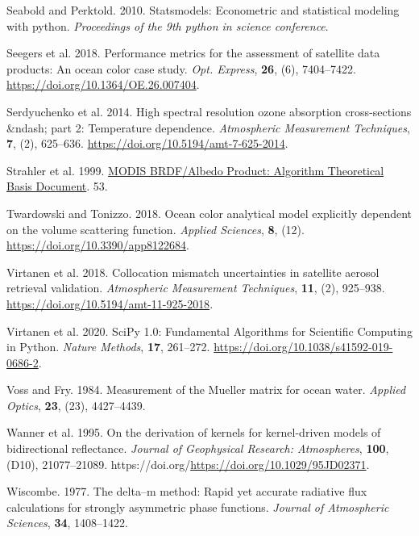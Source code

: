 \documentclass[
  11pt,
  letterpaper,
]{scrreprt}
\newlength{\cslhangindent}
\newenvironment{CSLReferences}[2] %
 {\begin{list}{}{%
  \setlength{\itemindent}{0pt}
  \setlength{\leftmargin}{0pt}
  \setlength{\parsep}{0pt}
  \ifodd #1
   \setlength{\leftmargin}{\cslhangindent}
   \setlength{\itemindent}{-1\cslhangindent}
  \fi
  \setlength{\itemsep}{#2\baselineskip}}}
 {\end{list}}
\begin{document}
\begin{CSLReferences}{1}{1}
Seabold and Perktold. 2010. Statsmodels: Econometric and statistical
modeling with python. \emph{Proceedings of the 9th python in science
conference}.

Seegers et al. 2018. Performance metrics for the assessment of satellite
data products: An ocean color case study. \emph{Opt. Express},
\textbf{26}, (6), 7404--7422.
\url{https://doi.org/10.1364/OE.26.007404}.

Serdyuchenko et al. 2014. High spectral resolution ozone absorption
cross-sections \&ndash; part 2: Temperature dependence.
\emph{Atmospheric Measurement Techniques}, \textbf{7}, (2), 625--636.
\url{https://doi.org/10.5194/amt-7-625-2014}.

Strahler et al. 1999.
\href{https://modis.gsfc.nasa.gov/data/atbd/atbd_mod09.pdf}{{MODIS
BRDF/Albedo Product: Algorithm Theoretical Basis Document}}. 53.

Twardowski and Tonizzo. 2018. Ocean color analytical model explicitly
dependent on the volume scattering function. \emph{Applied Sciences},
\textbf{8}, (12). \url{https://doi.org/10.3390/app8122684}.

Virtanen et al. 2018. Collocation mismatch uncertainties in satellite
aerosol retrieval validation. \emph{Atmospheric Measurement Techniques},
\textbf{11}, (2), 925--938.
\url{https://doi.org/10.5194/amt-11-925-2018}.

Virtanen et al. 2020. {{SciPy} 1.0: Fundamental Algorithms for
Scientific Computing in Python}. \emph{Nature Methods}, \textbf{17},
261--272. \url{https://doi.org/10.1038/s41592-019-0686-2}.

Voss and Fry. 1984. {Measurement of the Mueller matrix for ocean water}.
\emph{Applied Optics}, \textbf{23}, (23), 4427--4439.

Wanner et al. 1995. On the derivation of kernels for kernel-driven
models of bidirectional reflectance. \emph{Journal of Geophysical
Research: Atmospheres}, \textbf{100}, (D10), 21077--21089.
https://doi.org/\url{https://doi.org/10.1029/95JD02371}.

Wiscombe. 1977. The delta--m method: Rapid yet accurate radiative flux
calculations for strongly asymmetric phase functions. \emph{Journal of
Atmospheric Sciences}, \textbf{34}, 1408--1422.


\end{CSLReferences}
\end{document}
